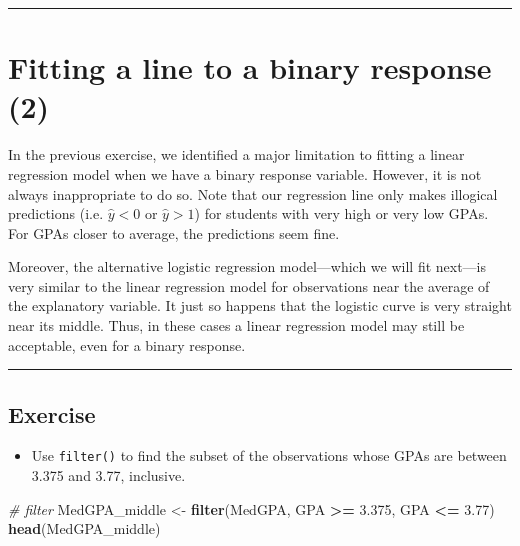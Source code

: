 \documentclass[]{book}
\newenvironment{Shaded}{\begin{snugshade}}{\end{snugshade}}
\newcommand{\KeywordTok}[1]{\textcolor[rgb]{0.13,0.29,0.53}{\textbf{#1}}}
\newcommand{\FloatTok}[1]{\textcolor[rgb]{0.00,0.00,0.81}{#1}}
\newcommand{\StringTok}[1]{\textcolor[rgb]{0.31,0.60,0.02}{#1}}
\newcommand{\CommentTok}[1]{\textcolor[rgb]{0.56,0.35,0.01}{\textit{#1}}}
\newcommand{\OperatorTok}[1]{\textcolor[rgb]{0.81,0.36,0.00}{\textbf{#1}}}
\newcommand{\NormalTok}[1]{#1}
\providecommand{\tightlist}{%
  \setlength{\itemsep}{0pt}\setlength{\parskip}{0pt}}
\begin{document}
\begin{center}\rule{0.5\linewidth}{\linethickness}\end{center}

\section{Fitting a line to a binary response
(2)}\label{fitting-a-line-to-a-binary-response-2}

In the previous exercise, we identified a major limitation to fitting a
linear regression model when we have a binary response variable.
However, it is not always inappropriate to do so. Note that our
regression line only makes illogical predictions (i.e. \(\hat{y} < 0\)
or \(\hat{y} > 1\)) for students with very high or very low GPAs. For
GPAs closer to average, the predictions seem fine.

Moreover, the alternative logistic regression model---which we will fit
next---is very similar to the linear regression model for observations
near the average of the explanatory variable. It just so happens that
the logistic curve is very straight near its middle. Thus, in these
cases a linear regression model may still be acceptable, even for a
binary response.

\begin{center}\rule{0.5\linewidth}{\linethickness}\end{center}

\subsection*{Exercise}\label{exercise-13}

\begin{itemize}
\tightlist
\item
  Use \texttt{filter()} to find the subset of the observations whose
  GPAs are between 3.375 and 3.77, inclusive.
\end{itemize}

\begin{Shaded}
\begin{Highlighting}[]
\CommentTok{# filter}
\NormalTok{MedGPA_middle <-}\StringTok{ }\KeywordTok{filter}\NormalTok{(MedGPA, GPA }\OperatorTok{>=}\StringTok{ }\FloatTok{3.375}\NormalTok{, GPA }\OperatorTok{<=}\StringTok{ }\FloatTok{3.77}\NormalTok{)}
\KeywordTok{head}\NormalTok{(MedGPA_middle)}
\end{Highlighting}
\end{Shaded}
\end{document}
